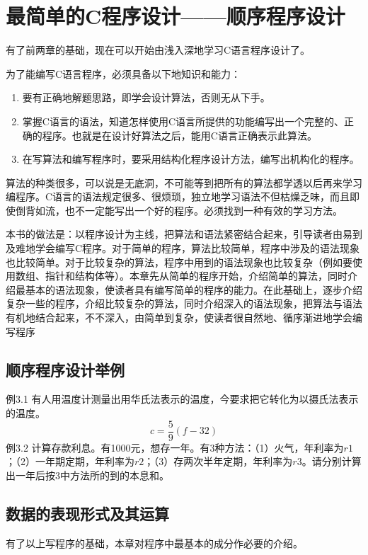 \chapter{最简单的C程序设计——顺序程序设计}

有了前两章的基础，现在可以开始由浅入深地学习C语言程序设计了。

为了能编写C语言程序，必须具备以下地知识和能力：
\begin{enumerate}
	\item 要有正确地解题思路，即学会设计算法，否则无从下手。
	\item 掌握C语言的语法，知道怎样使用C语言所提供的功能编写出一个完整的、正确的程序。也就是在设计好算法之后，能用C语言正确表示此算法。
	\item 在写算法和编写程序时，要采用结构化程序设计方法，编写出机构化的程序。
\end{enumerate}
算法的种类很多，可以说是无底洞，不可能等到把所有的算法都学透以后再来学习编程序。C语言的语法规定很多、很烦琐，独立地学习语法不但枯燥乏味，而且即使倒背如流，也不一定能写出一个好的程序。必须找到一种有效的学习方法。

本书的做法是：以程序设计为主线，把算法和语法紧密结合起来，引导读者由易到及难地学会编写C程序。对于简单的程序，算法比较简单，程序中涉及的语法现象也比较简单。对于比较复杂的算法，程序中用到的语法现象也比较复杂（例如要使用数组、指针和结构体等）。本章先从简单的程序开始，介绍简单的算法，同时介绍最基本的语法现象，使读者具有编写简单的程序的能力。在此基础上，逐步介绍复杂一些的程序，介绍比较复杂的算法，同时介绍深入的语法现象，把算法与语法有机地结合起来，不不深入，由简单到复杂，使读者很自然地、循序渐进地学会编写程序
\section{顺序程序设计举例}
例3.1 有人用温度计测量出用华氏法表示的温度，今要求把它转化为以摄氏法表示的温度。
\begin{equation}
	c = \frac{5}{9}(f - 32)
\end{equation}
例3.2 计算存款利息。有1000元，想存一年。有3种方法：（1）火气，年利率为$r1$；（2）一年期定期，年利率为$r2$；（3）存两次半年定期，年利率为$r3$。请分别计算出一年后按3中方法所的到的本息和。
\section{数据的表现形式及其运算}
有了以上写程序的基础，本章对程序中最基本的成分作必要的介绍。
